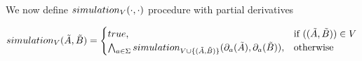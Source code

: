 \documentclass[a4paper,UKenglish,cleveref, autoref, thm-restate]{lipics-v2021}
\begin{document}
We now define $\simulationb{V}{\cdot}{\cdot}$ procedure with partial derivatives
\begin{definition}
\begin{align}
\simulationb{V}{\tilde{A}}{\tilde{B}} =\begin{cases}
			\true, & \text{if }(\pder{A}{B}) \in V\\
                      \bigwedge_{a \in \Sigma}\simulationb{V \cup \{\pder{A}{B}\}}{\mypar{a}{\tilde{A}}}{\mypar{a}{\tilde{B}}}, & \text{otherwise}
		 \end{cases}
\end{align}
\end{definition}

\end{document}
